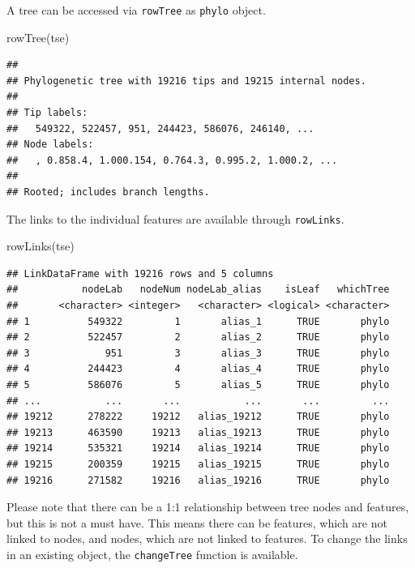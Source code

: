 \documentclass[
]{book}
\newenvironment{Shaded}{\begin{snugshade}}{\end{snugshade}}
\newcommand{\FunctionTok}[1]{\textcolor[rgb]{0.00,0.00,0.00}{#1}}
\newcommand{\NormalTok}[1]{#1}
\begin{document}
A tree can be accessed via \texttt{rowTree} as \texttt{phylo} object.

\begin{Shaded}
\begin{Highlighting}[]
\FunctionTok{rowTree}\NormalTok{(tse)}
\end{Highlighting}
\end{Shaded}

\begin{verbatim}
## 
## Phylogenetic tree with 19216 tips and 19215 internal nodes.
## 
## Tip labels:
##   549322, 522457, 951, 244423, 586076, 246140, ...
## Node labels:
##   , 0.858.4, 1.000.154, 0.764.3, 0.995.2, 1.000.2, ...
## 
## Rooted; includes branch lengths.
\end{verbatim}

The links to the individual features are available through \texttt{rowLinks}.

\begin{Shaded}
\begin{Highlighting}[]
\FunctionTok{rowLinks}\NormalTok{(tse)}
\end{Highlighting}
\end{Shaded}

\begin{verbatim}
## LinkDataFrame with 19216 rows and 5 columns
##           nodeLab   nodeNum nodeLab_alias    isLeaf   whichTree
##       <character> <integer>   <character> <logical> <character>
## 1          549322         1       alias_1      TRUE       phylo
## 2          522457         2       alias_2      TRUE       phylo
## 3             951         3       alias_3      TRUE       phylo
## 4          244423         4       alias_4      TRUE       phylo
## 5          586076         5       alias_5      TRUE       phylo
## ...           ...       ...           ...       ...         ...
## 19212      278222     19212   alias_19212      TRUE       phylo
## 19213      463590     19213   alias_19213      TRUE       phylo
## 19214      535321     19214   alias_19214      TRUE       phylo
## 19215      200359     19215   alias_19215      TRUE       phylo
## 19216      271582     19216   alias_19216      TRUE       phylo
\end{verbatim}

Please note that there can be a 1:1 relationship between tree nodes and
features, but this is not a must have. This means there can be features, which
are not linked to nodes, and nodes, which are not linked to features. To change
the links in an existing object, the \texttt{changeTree} function is available.
\end{document}

